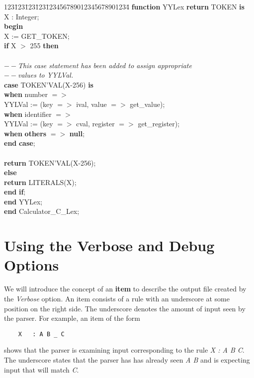 \newpage
\begin{tabbing}
123\=123\=123\=123\=123456789012345678901234\= \kill
\>  {\bf function} YYLex {\bf return} TOKEN {\bf is}\\
\>\>    X   : Integer;\\
\>  {\bf begin}\\
\>\>    X := GET\_TOKEN;\\
\>\>    {\bf if} X $>$ 255 {\bf then}\\
\\
\>\>    $--${\it  This case statement has been added to assign appropriate}\\
\>\>    $--${\it  values to YYLVal.}\\
\>\>    {\bf case} TOKEN'VAL(X-256) {\bf is}\\
\>\>\>      {\bf when} number     $=>$\\
\>\>\>\>        YYLVal := (key $=>$ ival, value $=>$ get\_value);\\
\>\>\>      {\bf when} identifier $=>$\\
\>\>\>\>        YYLVal := (key $=>$ cval, register $=>$ get\_register);\\
\>\>\>      {\bf when} {\bf others} $=>$ {\bf null};\\
\>\>\>    {\bf end} {\bf case};\\
\\
\>\>\>      {\bf return} TOKEN'VAL(X-256);\\
\>\>    {\bf else}\\
\>\>\>      {\bf return} LITERALS(X);\\
\>\>    {\bf end} {\bf if};\\
\>  {\bf end} YYLex;\\
{\bf end} Calculator\_C\_Lex;\\
\end{tabbing}
\newpage
\section{Using the Verbose and Debug Options}
We will introduce the concept of an {\bf item} to describe the output file
created by the {\it Verbose} option.  An item consists of a rule with
an underscore at some position on the right side.  The underscore denotes
the amount of input seen by the parser.  For example, an item of the form
\begin{verbatim}
    X	: A B _ C
\end{verbatim}
shows that the parser is examining input corresponding to the rule
{\it X : A B C}.
The underscore states that the parser has has already seen
{\it A B}
and is expecting input that will match
{\it C}.

